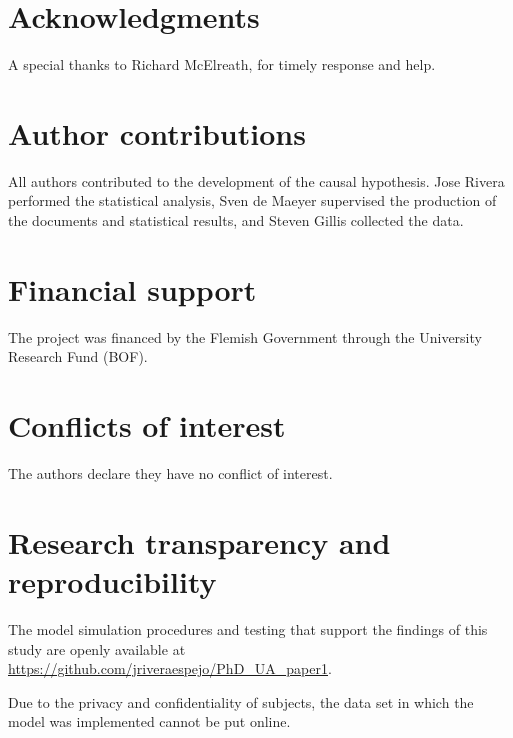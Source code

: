 \section{Acknowledgments}
%
A special thanks to Richard McElreath, for timely response and help.
%
\begin{comment}
and also to Tine van Daal, Marijn Gijsen, and Lies Appels for giving feedback to preliminary versions of this document.
\end{comment}
%
%
\section{Author contributions}
All authors contributed to the development of the causal hypothesis. Jose Rivera performed the statistical analysis, Sven de Maeyer supervised the production of the documents and statistical results, and Steven Gillis collected the data.
%
%
\section{Financial support}
%
The project was financed by the Flemish Government through the University Research Fund (BOF).
%
%
\section{Conflicts of interest}
The authors declare they have no conflict of interest.
%
%
\section{Research transparency and reproducibility}
The model simulation procedures and testing that support the findings of this study are openly available at \url{https://github.com/jriveraespejo/PhD_UA_paper1}.

Due to the privacy and confidentiality of subjects, the data set in which the model was implemented cannot be put online.
%
%
